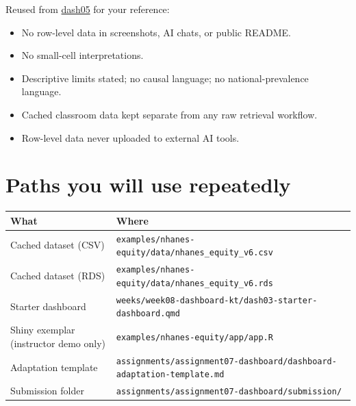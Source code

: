 \documentclass[
  letterpaper,
  DIV=11,
  numbers=noendperiod,
  oneside]{scrreprt}
\providecommand{\tightlist}{%
  \setlength{\itemsep}{0pt}\setlength{\parskip}{0pt}}
\begin{document}

Reused from
\hyperref[testing-privacy-safe-publishing-and-the-shiny-demo]{dash05}
for your reference:

\begin{itemize}
\tightlist
\item
  No row-level data in screenshots, AI chats, or public README.
\item
  No small-cell interpretations.
\item
  Descriptive limits stated; no causal language; no national-prevalence
  language.
\item
  Cached classroom data kept separate from any raw retrieval workflow.
\item
  Row-level data never uploaded to external AI tools.
\end{itemize}

\section*{Paths you will use
repeatedly}\label{paths-you-will-use-repeatedly}


\begin{longtable}[]{@{}
  >{\raggedright\arraybackslash}p{}
  >{\raggedright\arraybackslash}p{}@{}}
\toprule\noalign{}
\begin{minipage}[b]{\linewidth}\raggedright
What
\end{minipage} & \begin{minipage}[b]{\linewidth}\raggedright
Where
\end{minipage} \\
\midrule\noalign{}
\endhead
\bottomrule\noalign{}
\endlastfoot
Cached dataset (CSV) &
\texttt{examples/nhanes-equity/data/nhanes\_equity\_v6.csv} \\
Cached dataset (RDS) &
\texttt{examples/nhanes-equity/data/nhanes\_equity\_v6.rds} \\
Starter dashboard &
\texttt{weeks/week08-dashboard-kt/dash03-starter-dashboard.qmd} \\
Shiny exemplar (instructor demo only) &
\texttt{examples/nhanes-equity/app/app.R} \\
Adaptation template &
\texttt{assignments/assignment07-dashboard/dashboard-adaptation-template.md} \\
Submission folder &
\texttt{assignments/assignment07-dashboard/submission/} \\
\end{longtable}
\end{document}
